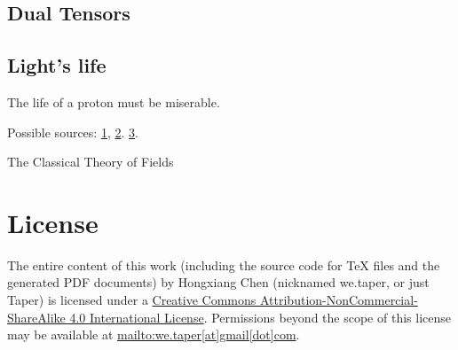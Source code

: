 \documentclass{article}
\numberwithin{equation}{subsection} %
\theoremstyle{definition}
\begin{document}
    \subsection{Dual Tensors}
    \label{secinDual_Tensors}
    \subsection{Light's life}
    \label{sec:Lights_life}
    The life of a proton must be miserable.
    
    Possible sources: \href{http://physics.stackexchange.com/questions/16018/does-a-photon-in-vacuum-have-a-rest-frame}{1},
    \href{http://physics.stackexchange.com/questions/29082/would-time-freeze-if-you-could-travel-at-the-speed-of-light}{2}.
    \href{https://www.quora.com/What-does-the-frame-of-reference-of-a-photon-look-like}{3}.
\begin{thebibliography}{1}
     The Classical Theory of Fields
\end{thebibliography}
\printnomenclature
\section{License}
The entire content of this work (including the source code
for TeX files and the generated PDF documents) by 
Hongxiang Chen (nicknamed we.taper, or just Taper) is
licensed under a 
\href{http://creativecommons.org/licenses/by-nc-sa/4.0/}{Creative 
Commons Attribution-NonCommercial-ShareAlike 4.0 International 
License}. Permissions beyond the scope of this 
license may be available at \url{mailto:we.taper[at]gmail[dot]com}.
\end{document}

